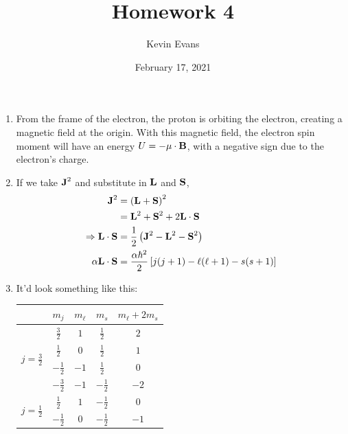\documentclass{homework}
\title{Homework 4}
\author{Kevin Evans}
\date{February 17, 2021}
\begin{document}
	\maketitle
	\begin{enumerate}
		\item From the frame of the electron, the proton is orbiting the electron, creating a magnetic field at the origin. With this magnetic field, the electron spin moment will have an energy $U = -\mu \cdot \boldsymbol{\mathrm{B}}$, with a negative sign due to the electron's charge. 
		
		\item If we take $\boldsymbol{\mathrm{J}}^2$ and substitute in $\boldsymbol{\mathrm{L}}$ and $\boldsymbol{\mathrm{S}}$, \begin{align*}
			\boldsymbol{\mathrm{J}}^2 & = \left(\boldsymbol{\mathrm{L}} + \boldsymbol{\mathrm{S}}\right)^2 \\
				& = \boldsymbol{\mathrm{L}}^2 + \boldsymbol{\mathrm{S}}^2 + 2 \boldsymbol{\mathrm{L}} \cdot \boldsymbol{\mathrm{S}} \\
			\Rightarrow \boldsymbol{\mathrm{L}} \cdot \boldsymbol{\mathrm{S}} & = \frac{1}{2} \left(\boldsymbol{\mathrm{J}}^2 - \boldsymbol{\mathrm{L}}^2 - \boldsymbol{\mathrm{S}}^2\right) \\
			\alpha \boldsymbol{\mathrm{L}} \cdot \boldsymbol{\mathrm{S}} & = \frac{\alpha \hbar^2}{2} \left[j(j+1) - \ell(\ell+1) - s(s+1) \right]
		\end{align*}
	
		\item It'd look something like this:
		\begin{center}
			\begin{tabular}{cc|cc|c}
				\toprule
				& $m_j$ & $m_\ell$ & $m_s$ & $m_\ell + 2 m_s$ \\
				\midrule
				\multirow{4}{*}{$j=\frac{3}{2}$} & $\frac{3}{2}$ & $1$ & $\frac{1}{2}$ & $2$ \\
					& $\frac{1}{2}$ & $0$ & $\frac{1}{2}$ & $1$ \\
					& $-\frac{1}{2}$ & $-1$ & $\frac{1}{2}$ & $0$ \\
					& $-\frac{3}{2}$ & $-1$ & $-\frac{1}{2}$ & $-2$  \\
					\midrule
				\multirow{2}{*}{$j=\frac{1}{2}$} & $\frac{1}{2}$ & $1$ & $-\frac{1}{2}$ & $0$ \\
				& $-\frac{1}{2}$ & $0$ & $-\frac{1}{2}$ & $-1$ \\
				\bottomrule
			\end{tabular}					
		\end{center}
	

\end{enumerate}
\end{document}
